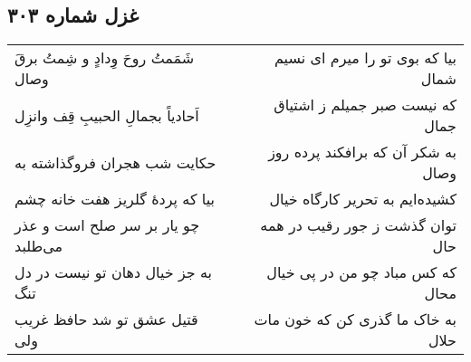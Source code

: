 \begin{center}
\section*{غزل شماره ۳۰۳}
\label{sec:sh303}
\begin{longtable}{l p{0.5cm} r}
شَمَمتُ روحَ وِدادٍ و شِمتُ برقَ وصال
&&
بیا که بوی تو را میرم ای نسیم شمال
\\
اَحادیاً بجمالِ الحبیبِ قِف وانزِل
&&
که نیست صبر جمیلم ز اشتیاق جمال
\\
حکایت شب هجران فروگذاشته به
&&
به شکر آن که برافکند پرده روز وصال
\\
بیا که پردهٔ گلریز هفت خانه چشم
&&
کشیده‌ایم به تحریر کارگاه خیال
\\
چو یار بر سر صلح است و عذر می‌طلبد
&&
توان گذشت ز جور رقیب در همه حال
\\
به جز خیال دهان تو نیست در دل تنگ
&&
که کس مباد چو من در پی خیال محال
\\
قتیل عشق تو شد حافظ غریب ولی
&&
به خاک ما گذری کن که خون مات حلال
\\
\end{longtable}
\end{center}
